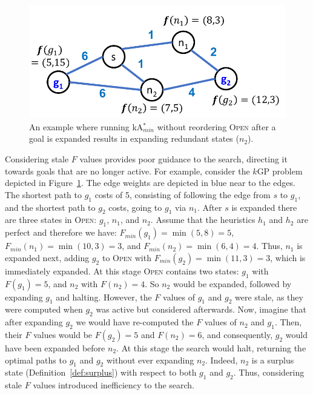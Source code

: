 \documentclass{aicom2e}
\newcommand{\kgs}{$k$GP}
\newcommand{\kastarmin}{kA$^*_{min}$}
\newcommand{\open}{\textsc{Open}}
\begin{document}


\begin{figure}
    \includegraphics[width=0.9\columnwidth]{need-resort_cropped.pdf}
    \caption{An example where running \kastarmin{} without reordering \open{} after a goal is expanded
        results in expanding redundant states ($n_2$).}
    \label{fig:need-resort}
\end{figure}

Considering stale $F$ values provides poor guidance to the search, directing it
towards goals that are no longer active. For example, consider the \kgs{}
problem depicted in Figure~\ref{fig:need-resort}. The edge weights are depicted in blue 
near to the edges. The shortest path to $g_1$ costs of 5, consisting of following the edge from $s$ to $g_1$, 
and the shortest path to $g_2$ costs, going to $g_1$ via $n_1$. After $s$ is expanded there are three states in \open{}: $g_1$, $n_1$, and $n_2$. Assume that the heuristics $h_1$ and $h_2$ are perfect and therefore we have:
$F_{min}(g_1)=\min (5,8)=5$, 
$F_{min}(n_1)=\min (10,3)=3$, 
and $F_{min}(n_2)=\min (6,4)=4$. Thus, $n_1$ is expanded next, adding $g_2$ to \open{} with 
$F_{min}(g_2)=\min (11,3)=3$, which is immediately expanded. 
At this stage \open{} contains two states: $g_1$ with $F(g_1)=5$, and $n_2$ with $F(n_2)=4$. 
So $n_2$ would be expanded, followed by expanding $g_1$ and halting. 
However, the $F$ values of $g_1$ and $g_2$ were stale, as they were computed when $g_2$ was active but considered afterwards. 
Now, imagine that after expanding $g_2$ we would have re-computed the $F$ values of $n_2$ and $g_1$. 
Then, their $F$ values would be $F(g_2)=5$ and $F(n_2)=6$, and consequently, $g_2$ would have been expanded before $n_2$. 
At this stage the search would halt, returning the optimal paths to $g_1$ and $g_2$ without ever expanding $n_2$. Indeed, $n_2$ is a surplus state (Definition~\ref{def:surplus}) with respect to both $g_1$ and $g_2$. 
Thus, considering stale $F$ values introduced inefficiency to the search. 
\end{document}
